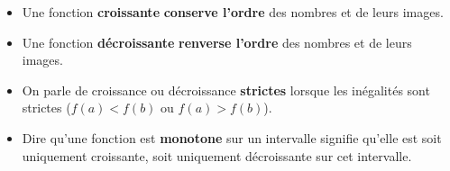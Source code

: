 \begin{rem}
	\nline
	\begin{itemize}
		\item Une fonction \textbf{croissante} \textbf{conserve l'ordre} des nombres et de leurs images.
		\item Une fonction \textbf{décroissante} \textbf{renverse l'ordre} des nombres et de leurs images.
		\item On parle de croissance ou décroissance \textbf{strictes} lorsque les inégalités sont strictes ($f(a) < f(b)$ ou $f(a) > f(b)$).
		\item Dire qu'une fonction est \textbf{monotone} sur un intervalle signifie qu'elle est soit uniquement croissante, soit uniquement décroissante sur cet intervalle.
	\end{itemize}
\end{rem}

\newpage

